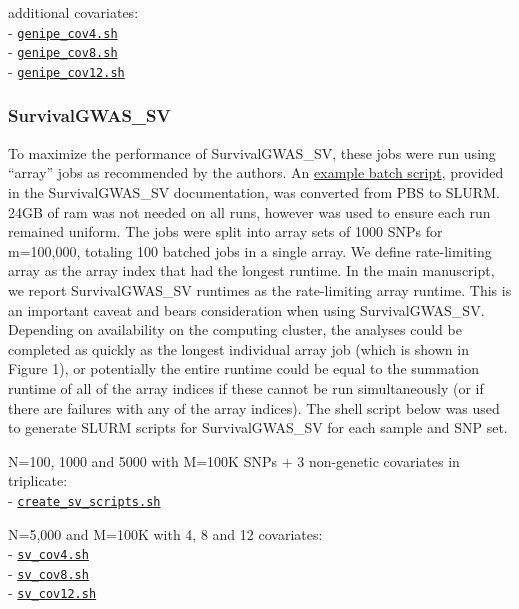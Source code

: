 \documentclass[]{DissertateUSU}
\begin{document}
additional covariates:\\
-
\href{https://github.com/suchestoncampbelllab/gwasurvivr_manuscript/blob/master/diff_cov_benchmarks/code/genipe_cov4.sh}{\texttt{genipe\_cov4.sh}}\\
-
\href{https://github.com/suchestoncampbelllab/gwasurvivr_manuscript/blob/master/diff_cov_benchmarks/code/genipe_cov8.sh}{\texttt{genipe\_cov8.sh}}\\
-
\href{https://github.com/suchestoncampbelllab/gwasurvivr_manuscript/blob/master/diff_cov_benchmarks/code/genipe_cov12.sh}{\texttt{genipe\_cov12.sh}}

\subsubsection{SurvivalGWAS\_SV}\label{survivalgwas_sv}

To maximize the performance of SurvivalGWAS\_SV, these jobs were run
using ``array'' jobs as recommended by the authors. An
\href{https://www.liverpool.ac.uk/media/livacuk/instituteoftranslationalmedicine/biostats/batchexample.sh}{example
batch script}, provided in the SurvivalGWAS\_SV documentation, was
converted from PBS to SLURM. 24GB of ram was not needed on all runs,
however was used to ensure each run remained uniform. The jobs were
split into array sets of 1000 SNPs for m=100,000, totaling 100 batched
jobs in a single array. We define rate-limiting array as the array index
that had the longest runtime. In the main manuscript, we report
SurvivalGWAS\_SV runtimes as the rate-limiting array runtime. This is an
important caveat and bears consideration when using SurvivalGWAS\_SV.
Depending on availability on the computing cluster, the analyses could
be completed as quickly as the longest individual array job (which is
shown in Figure 1), or potentially the entire runtime could be equal to
the summation runtime of all of the array indices if these cannot be run
simultaneously (or if there are failures with any of the array indices).
The shell script below was used to generate SLURM scripts for
SurvivalGWAS\_SV for each sample and SNP set.

N=100, 1000 and 5000 with M=100K SNPs + 3 non-genetic covariates in
triplicate:\\
-
\href{https://github.com/suchestoncampbelllab/gwasurvivr_manuscript/blob/master/benchmark_experiments/code/create_sv_scripts.sh}{\texttt{create\_sv\_scripts.sh}}

N=5,000 and M=100K with 4, 8 and 12 covariates:\\
-
\href{https://github.com/suchestoncampbelllab/gwasurvivr_manuscript/blob/master/diff_cov_benchmarks/code/sv_cov4.sh}{\texttt{sv\_cov4.sh}}\\
-
\href{https://github.com/suchestoncampbelllab/gwasurvivr_manuscript/blob/master/diff_cov_benchmarks/code/sv_cov8.sh}{\texttt{sv\_cov8.sh}}\\
-
\href{https://github.com/suchestoncampbelllab/gwasurvivr_manuscript/blob/master/diff_cov_benchmarks/code/sv_cov12.sh}{\texttt{sv\_cov12.sh}}
\end{document}
